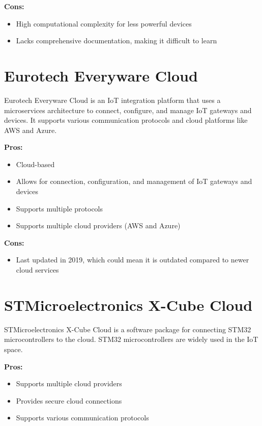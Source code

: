 \textbf{Cons:}
\begin{itemize}
    \item High computational complexity for less powerful devices
    \item Lacks comprehensive documentation, making it difficult to learn
\end{itemize}

\section{Eurotech Everyware Cloud}
\label{everyware-cloud}
Eurotech\cite{site:eurotech} Everyware Cloud is an IoT integration platform that uses a microservices architecture to connect, configure, and manage IoT gateways and devices. It supports various communication protocols and cloud platforms like AWS and Azure.

\textbf{Pros:}
\begin{itemize}
    \item Cloud-based
    \item Allows for connection, configuration, and management of IoT gateways and devices
    \item Supports multiple protocols
    \item Supports multiple cloud providers (AWS and Azure)
\end{itemize}

\textbf{Cons:}
\begin{itemize}
    \item Last updated in 2019, which could mean it is outdated compared to newer cloud services
\end{itemize}

\section{STMicroelectronics X-Cube Cloud}
\label{stm}
STMicroelectronics\cite{site:st-micro} X-Cube Cloud is a software package for connecting STM32 microcontrollers to the cloud. STM32 microcontrollers are widely used in the IoT space.

\textbf{Pros:}
\begin{itemize}
    \item Supports multiple cloud providers
    \item Provides secure cloud connections
    \item Supports various communication protocols
\end{itemize}

